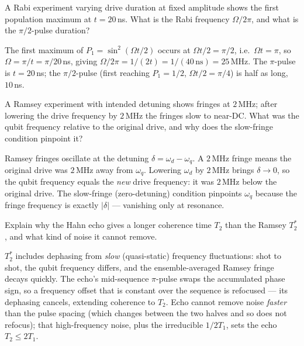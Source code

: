 \begin{exercise}
A Rabi experiment varying drive duration at fixed amplitude shows the
first population maximum at $t=20\,$ns. What is the Rabi frequency
$\Omega/2\pi$, and what is the $\pi/2$-pulse duration?
\begin{solution}
The first maximum of $P_1=\sin^2(\Omega t/2)$ occurs at
$\Omega t/2=\pi/2$, i.e.\ $\Omega t=\pi$, so $\Omega=\pi/t
=\pi/20\,$ns, giving $\Omega/2\pi=1/(2t)=1/(40\,\text{ns})=25\,$MHz. The
$\pi$-pulse is $t=20\,$ns; the $\pi/2$-pulse (first reaching
$P_1=1/2$, $\Omega t/2=\pi/4$) is half as long, $10\,$ns.
\end{solution}
\end{exercise}

\begin{exercise}
A Ramsey experiment with intended detuning shows fringes at
$2\,$MHz; after lowering the drive frequency by $2\,$MHz the fringes
slow to near-DC. What was the qubit frequency relative to the original
drive, and why does the slow-fringe condition pinpoint it?
\begin{solution}
Ramsey fringes oscillate at the detuning $\delta=\omega_d-\omega_q$. A
$2\,$MHz fringe means the original drive was $2\,$MHz away from
$\omega_q$. Lowering $\omega_d$ by $2\,$MHz brings $\delta\to0$, so the
qubit frequency equals the \emph{new} drive frequency: it was
$2\,$MHz below the original drive. The slow-fringe (zero-detuning)
condition pinpoints $\omega_q$ because the fringe frequency is exactly
$|\delta|$ --- vanishing only at resonance.
\end{solution}
\end{exercise}

\begin{exercise}
Explain why the Hahn echo gives a longer coherence time $T_2$ than the
Ramsey $T_2^*$, and what kind of noise it cannot remove.
\begin{solution}
$T_2^*$ includes dephasing from \emph{slow} (quasi-static) frequency
fluctuations: shot to shot, the qubit frequency differs, and the
ensemble-averaged Ramsey fringe decays quickly. The echo's mid-sequence
$\pi$-pulse swaps the accumulated phase sign, so a frequency offset that
is constant over the sequence is refocused --- its dephasing cancels,
extending coherence to $T_2$. Echo cannot remove noise \emph{faster}
than the pulse spacing (which changes between the two halves and so does
not refocus); that high-frequency noise, plus the irreducible $1/2T_1$,
sets the echo $T_2\le2T_1$.
\end{solution}
\end{exercise}

